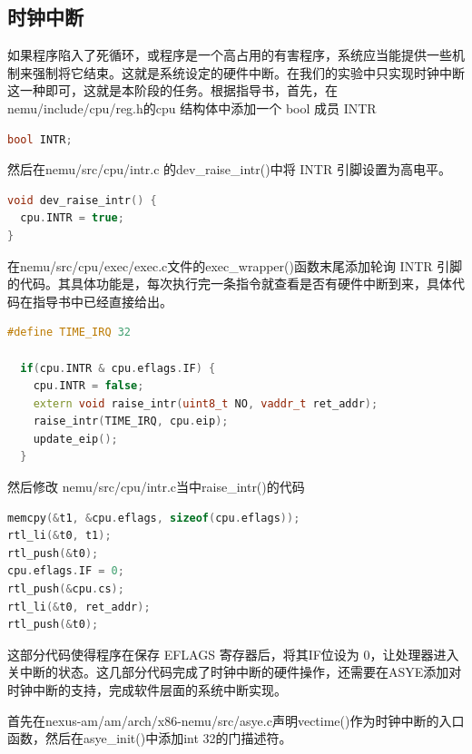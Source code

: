 \documentclass[UTF8,a4paper,10pt]{ctexart}
\begin{document}
\subsection{时钟中断}
如果程序陷入了死循环，或程序是一个高占用的有害程序，系统应当能提供一些机制来强制将它结束。这就是系统设定的硬件中断。在我们的实验中只实现时钟中断这一种即可，这就是本阶段的任务。根据指导书，首先，在 nemu/include/cpu/reg.h的cpu 结构体中添加一个 bool 成员 INTR
\begin{lstlisting}[language = C++]
bool INTR;
\end{lstlisting}
然后在nemu/src/cpu/intr.c 的dev\_raise\_intr()中将 INTR 引脚设置为高电平。
\begin{lstlisting}[language = C++]
void dev_raise_intr() {
  cpu.INTR = true;
}
\end{lstlisting}
在nemu/src/cpu/exec/exec.c文件的exec\_wrapper()函数末尾添加轮询 INTR 引脚的代码。其具体功能是，每次执行完一条指令就查看是否有硬件中断到来，具体代码在指导书中已经直接给出。
\begin{lstlisting}[language = C++]
#define TIME_IRQ 32

  if(cpu.INTR & cpu.eflags.IF) {
    cpu.INTR = false;
    extern void raise_intr(uint8_t NO, vaddr_t ret_addr);
    raise_intr(TIME_IRQ, cpu.eip);
    update_eip();
  }
\end{lstlisting}

然后修改 nemu/src/cpu/intr.c当中raise\_intr()的代码

\begin{lstlisting}[language = C++]
memcpy(&t1, &cpu.eflags, sizeof(cpu.eflags));
rtl_li(&t0, t1);
rtl_push(&t0);
cpu.eflags.IF = 0;
rtl_push(&cpu.cs);
rtl_li(&t0, ret_addr);
rtl_push(&t0);
\end{lstlisting}
这部分代码使得程序在保存 EFLAGS 寄存器后，将其IF位设为 0，让处理器进入关中断的状态。这几部分代码完成了时钟中断的硬件操作，还需要在ASYE添加对时钟中断的支持，完成软件层面的系统中断实现。

首先在nexus-am/am/arch/x86-nemu/src/asye.c声明vectime()作为时钟中断的入口函数，然后在asye\_init()中添加int 32的门描述符。
\end{document}

